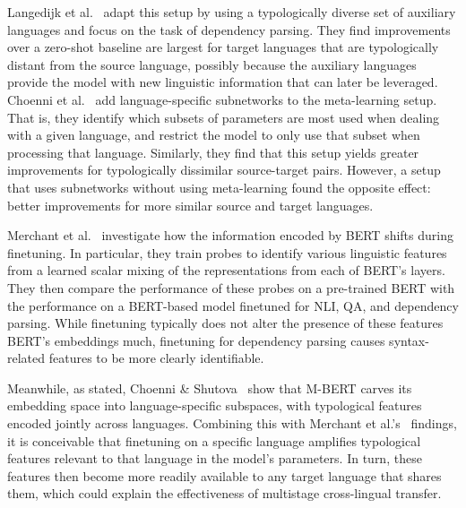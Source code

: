 Langedijk et al.~\cite{langedijk-etal-2022-meta} adapt this setup by using a typologically diverse set of auxiliary languages and focus on the task of dependency parsing. They find improvements over a zero-shot baseline are largest for target languages that are typologically distant from the source language, possibly because the auxiliary languages provide the model with new linguistic information that can later be leveraged. Choenni et al.~\cite{choenni-etal-2023-cross} add language-specific subnetworks to the meta-learning setup. That is, they identify which subsets of parameters are most used when dealing with a given language, and restrict the model to only use that subset when processing that language. Similarly, they find that this setup yields greater improvements for typologically dissimilar source-target pairs. However, a setup that uses subnetworks without using meta-learning found the opposite effect: better improvements for more similar source and target languages.

Merchant et al.~\cite{merchant-etal-2020-happens} investigate how the information encoded by BERT shifts during finetuning. In particular, they train probes to identify various linguistic features from a learned scalar mixing of the representations from each of BERT's layers. They then compare the performance of these probes on a pre-trained BERT with the performance on a BERT-based model finetuned for NLI, QA, and dependency parsing. While finetuning typically does not alter the presence of these features BERT's embeddings much, finetuning for dependency parsing causes syntax-related features to be more clearly identifiable.

Meanwhile, as stated, Choenni \& Shutova~\cite{choenni-shutova-2022-investigating} show that M-BERT carves its embedding space into language-specific subspaces, with typological features encoded jointly across languages. Combining this with Merchant et al.'s~\cite{merchant-etal-2020-happens} findings, it is conceivable that finetuning on a specific language amplifies typological features relevant to that language in the model's parameters. In turn, these features then become more readily available to any target language that shares them, which could explain the effectiveness of multistage cross-lingual transfer.


